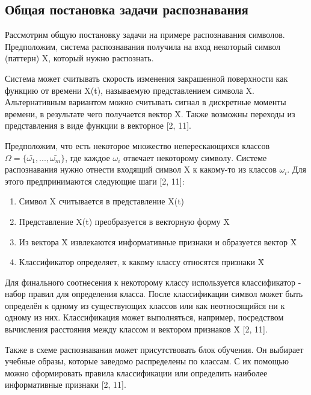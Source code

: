 
\subsection{Общая постановка задачи распознавания}
Рассмотрим общую постановку задачи на примере распознавания символов. Предположим, система распознавания получила на вход некоторый символ (паттерн) X, который нужно распознать.

Система может считывать скорость изменения закрашенной поверхности как функцию от времени X(t), называемую представлением символа X. Альтернативным вариантом можно считывать сигнал в дискретные моменты времени, в результате чего получается вектор \={X}. Также возможны переходы из представления в виде функции в векторное [2, 11].

Предположим, что есть некоторое множество неперескающихся классов $\Omega=\{\bar{\omega_1}, ..., \bar{\omega_m}\}$, где каждое $\omega_i$ отвечает некоторому символу. Системе распознавания нужно отнести входящий символ X к какому-то из классов $\omega_i$. Для этого предпринимаются следующие шаги [2, 11]:
\begin{enumerate}
    \item Символ X считывается в представление X(t)
    \item Представление X(t) преобразуется в векторную форму \=X
    \item Из вектора \=X извлекаются информативные признаки и образуется вектор \^X
    \item Классификатор определяет, к какому классу относятся признаки \^X
\end{enumerate}

Для финального соотнесения к некоторому классу используется классификатор - набор правил для определения класса. После классификации символ может быть определён к одному из существующих классов или как неотносящийся ни к одному из них. Классификация может выполняться, например, посредством вычисления расстояния между классом и вектором признаков \^X [2, 11].

Также в схеме распознавания может присутствовать блок обучения. Он выбирает учебные образы, которые заведомо распределены по классам. С их помощью можно сформировать правила классификации или определить наиболее информативные признаки [2, 11].

